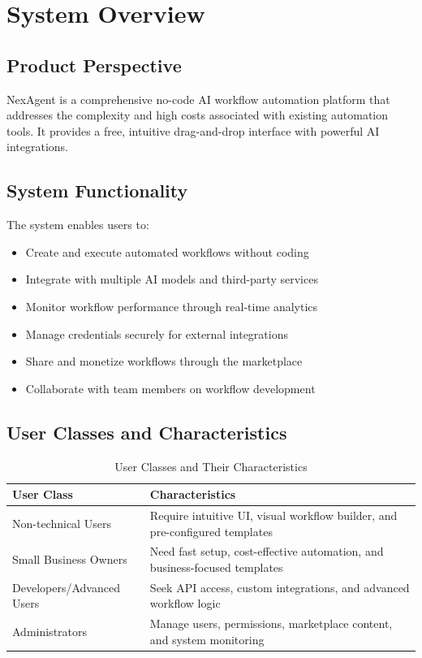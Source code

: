 \documentclass[12pt,a4paper]{article}
\begin{document}
\newpage

\section{System Overview}

\subsection{Product Perspective}
NexAgent is a comprehensive no-code AI workflow automation platform that addresses the complexity and high costs associated with existing automation tools. It provides a free, intuitive drag-and-drop interface with powerful AI integrations.

\subsection{System Functionality}
The system enables users to:
\begin{itemize}
    \item Create and execute automated workflows without coding
    \item Integrate with multiple AI models and third-party services
    \item Monitor workflow performance through real-time analytics
    \item Manage credentials securely for external integrations
    \item Share and monetize workflows through the marketplace
    \item Collaborate with team members on workflow development
\end{itemize}

\subsection{User Classes and Characteristics}

\begin{table}[h]
\centering
\begin{tabularx}{\textwidth}{|l|X|}
\hline
\textbf{User Class} & \textbf{Characteristics}\\
\hline
Non-technical Users & Require intuitive UI, visual workflow builder, and pre-configured templates\\
\hline
Small Business Owners & Need fast setup, cost-effective automation, and business-focused templates\\
\hline
Developers/Advanced Users & Seek API access, custom integrations, and advanced workflow logic\\
\hline
Administrators & Manage users, permissions, marketplace content, and system monitoring\\
\hline
\end{tabularx}
\caption{User Classes and Their Characteristics}
\end{table}
\end{document}
